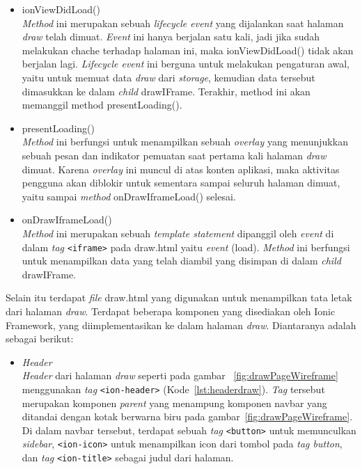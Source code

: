 \begin{enumerate}
	\begin{itemize}
		\item ionViewDidLoad() \\
		\textit{Method} ini merupakan sebuah \textit{lifecycle event} yang dijalankan saat halaman \textit{draw} telah dimuat. \textit{Event} ini hanya berjalan satu kali, jadi jika sudah melakukan chache terhadap halaman ini, maka ionViewDidLoad() tidak akan berjalan lagi. \textit{Lifecycle event} ini berguna untuk melakukan pengaturan awal, yaitu untuk memuat data \textit{draw} dari \textit{storage}, kemudian data tersebut dimasukkan ke dalam \textit{child} drawIFrame. Terakhir, method ini akan memanggil method presentLoading().
		\newpage
		\item presentLoading() \\
		\textit{Method} ini berfungsi untuk menampilkan sebuah \textit{overlay} yang menunjukkan sebuah pesan dan indikator pemuatan saat pertama kali halaman \textit{draw} dimuat. Karena \textit{overlay} ini muncul di atas konten aplikasi, maka aktivitas pengguna akan diblokir untuk sementara sampai seluruh halaman dimuat, yaitu sampai \textit{method} onDrawIframeLoad() selesai.
		\item onDrawIframeLoad() \\
		\textit{Method} ini merupakan sebuah \textit{template statement} dipanggil oleh \textit{event} di dalam \textit{tag} \texttt{<iframe>} pada draw.html yaitu \textit{event} (load). \textit{Method} ini berfungsi untuk menampilkan data yang telah diambil yang disimpan di dalam \textit{child} drawIFrame.
	\end{itemize}
	
	Selain itu terdapat \textit{file} draw.html yang digunakan untuk menampilkan tata letak dari halaman \textit{draw}. Terdapat beberapa komponen yang disediakan oleh Ionic Framework, yang diimplementasikan ke dalam halaman \textit{draw}. Diantaranya adalah sebagai berikut:	
	
	\begin{itemize}
		\item \textit{Header} \\
		\textit{Header} dari halaman \textit{draw} seperti pada gambar ~\ref{fig:drawPageWireframe} menggunakan \textit{tag} \texttt{<ion-header>} (Kode~\ref{lst:headerdraw}). \textit{Tag} tersebut merupakan komponen \textit{parent} yang menampung komponen navbar yang ditandai dengan kotak berwarna biru pada gambar~\ref{fig:drawPageWireframe}. Di dalam navbar tersebut, terdapat sebuah \textit{tag} \texttt{<button>} untuk memunculkan \textit{sidebar}, \texttt{<ion-icon>} untuk menampilkan icon dari tombol pada \textit{tag button}, dan \textit{tag} \texttt{<ion-title>} sebagai judul dari halaman.


\end{itemize}
\end{enumerate}
